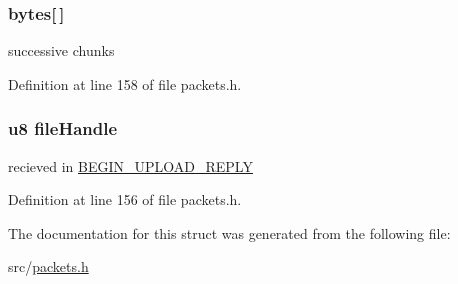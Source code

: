 \subsubsection[{bytes}]{ bytes\mbox{[}$\,$\mbox{]}}\label{struct_c_o_n_t_i_n_u_e___u_p_l_o_a_d___r_e_p_l_y_a1fdde1580342b6b1df0d8f5213c45107}
successive chunks 

Definition at line 158 of file packets.\+h.

\hypertarget{struct_c_o_n_t_i_n_u_e___u_p_l_o_a_d___r_e_p_l_y_afdfd867e8243b0ae1e245e467179c567}{}
\subsubsection[{file\+Handle}]{ {\bf u8} file\+Handle}\label{struct_c_o_n_t_i_n_u_e___u_p_l_o_a_d___r_e_p_l_y_afdfd867e8243b0ae1e245e467179c567}
recieved in \hyperlink{struct_b_e_g_i_n___u_p_l_o_a_d___r_e_p_l_y}{B\+E\+G\+I\+N\+\_\+\+U\+P\+L\+O\+A\+D\+\_\+\+R\+E\+P\+L\+Y} 

Definition at line 156 of file packets.\+h.



The documentation for this struct was generated from the following file\+:\begin{DoxyCompactItemize}
\item 
src/\hyperlink{packets_8h}{packets.\+h}\end{DoxyCompactItemize}
